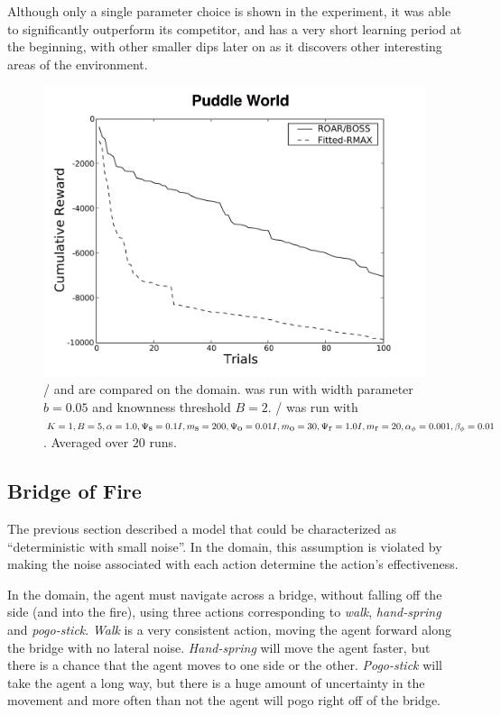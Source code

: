 Although only a single parameter choice is shown in the experiment, it was able to significantly outperform its competitor, and has a very short learning period at the beginning, with other smaller dips later on as it discovers other interesting areas of the environment.

\begin{figure}[t]
\vskip 0.2in
\begin{center}
\centerline{\includegraphics[width=\columnwidth]{figures/puddleFigure}}
\caption{/ and  are compared on the  domain.  was run with width parameter $b=0.05$ and knownness threshold $B=2$. / was run with $K=1, B=5, \alpha=1.0,\Psi_{\mbox s}=0.1I, m_{\mbox s}=200, \Psi_{\mbox o}=0.01I, m_{\mbox o}=30, \Psi_{\mbox r}=1.0I,m_{\mbox r}=20,\alpha_\phi=0.001,\beta_\phi=0.01$. Averaged over $20$ runs.}
\label{fig:puddle}
\end{center}
\vskip -0.2in
\end{figure} 


\subsection{Bridge of Fire}
\label{fire}

The previous section described a model that could be characterized as ``deterministic with small noise''. In the  domain, this assumption is violated by making the noise associated with each action determine the action's effectiveness.

In the  domain, the agent must navigate across a bridge, without falling off the side (and into the fire), using three actions corresponding to \emph{walk}, \emph{hand-spring} and \emph{pogo-stick}. \emph{Walk} is a very consistent action, moving the agent forward along the bridge with no lateral noise. \emph{Hand-spring} will move the agent faster, but there is a chance that the agent moves to one side or the other. \emph{Pogo-stick} will take the agent a long way, but there is a huge amount of uncertainty in the movement and more often than not the agent will pogo right off of the bridge.

